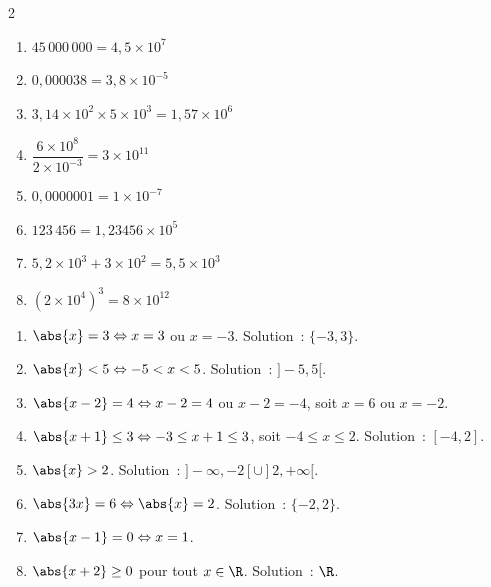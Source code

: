 
\begin{multicols}{2}
\begin{enumerate}
  \item $45\,000\,000=4{,}5\times10^7$
  \item $0{,}000038=3{,}8\times10^{-5}$
  \item $3{,}14\times10^2\times5\times10^3=1{,}57\times10^6$
  \item $\dfrac{6\times10^8}{2\times10^{-3}}=3\times10^{11}$
  \item $0{,}0000001=1\times10^{-7}$
  \item $123\,456=1{,}23456\times10^5$
  \item $5{,}2\times10^3+3\times10^2=5{,}5\times10^3$
  \item $(2\times10^4)^3=8\times10^{12}$
\end{enumerate}
\end{multicols}


\begin{enumerate}
  \item $\abs{x}=3 \Leftrightarrow x=3$ ou $x=-3$. Solution~: $\{-3,3\}$.
  \item $\abs{x}<5 \Leftrightarrow -5<x<5$. Solution~: $]-5,5[$.
  \item $\abs{x-2}=4 \Leftrightarrow x-2=4$ ou $x-2=-4$, soit $x=6$ ou $x=-2$.
  \item $\abs{x+1}\leq3 \Leftrightarrow -3\leq x+1\leq3$,
        soit $-4\leq x\leq2$. Solution~: $[-4,2]$.
  \item $\abs{x}>2$. Solution~: $]-\infty,-2[\cup]2,+\infty[$.
  \item $\abs{3x}=6\Leftrightarrow\abs{x}=2$. Solution~: $\{-2,2\}$.
  \item $\abs{x-1}=0\Leftrightarrow x=1$.
  \item $\abs{x+2}\geq0$ pour tout $x\in\R$. Solution~: $\R$.
\end{enumerate}


